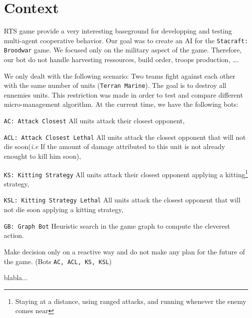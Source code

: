 \section{Context}

RTS game provide a very interesting baseground for developping and testing multi-agent cooperative behavior.
Our goal was to create an AI for the \texttt{Stacraft: Broodwar} game. We focused only on the military aspect of the game. Therefore, our bot do not handle harvesting ressources, build order, troops production, \ldots.

We only dealt with the following scenario: Two teams fight against each other with the same number of units (\texttt{Terran Marine}). The goal is to destroy all ennemies units.
This restriction was made in order to test and compare different micro-management algorithm. 
At the current time, we have the following bots:
\begin{shortitem}
\item \texttt{AC: Attack Closest} All units attack their closest opponent,
\item \texttt{ACL: Attack Closest Lethal} All units attack the closest opponent that will not die soon(\emph{i.e} If the amount of damage attributed to this unit is not already enought to kill him soon),
\item \texttt{KS: Kitting Strategy} All units attack their closest opponent applying a kitting\footnote{Staying at a distance, using ranged attacks, and running whenever the enemy comes near} strategy,
\item \texttt{KSL: Kitting Strategy Lethal} All units attack the closest opponent that will not die soon applying a kitting strategy,
\item \texttt{GB: Graph Bot} Heuristic search in the game graph to compute the cleverest action.
\end{shortitem}

\begin{definition}
Make decision only on a reactive way and do not make any plan for the future of the game. (Bots \texttt{AC, ACL, KS, KSL})
\end{definition}

\begin{definition}
blabla...
\end{definition}
